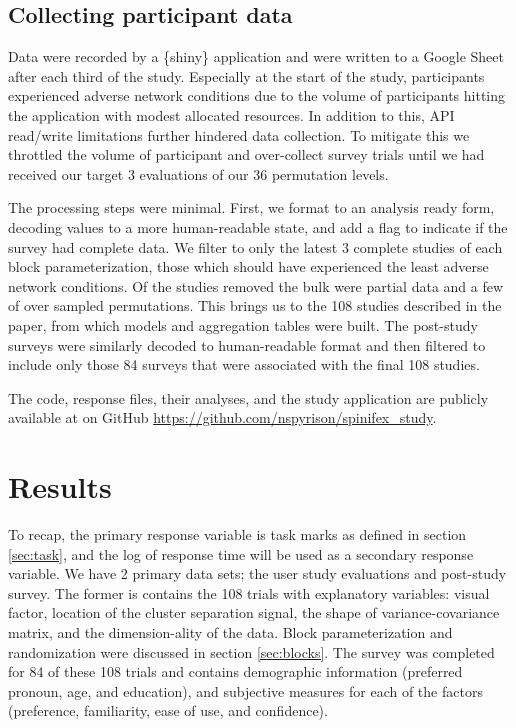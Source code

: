 \documentclass{template/monashthesis}
\begin{document}
\hypertarget{collecting-participant-data}{%
\subsection{Collecting participant data}\label{collecting-participant-data}}

Data were recorded by a \{shiny\} application and were written to a Google Sheet after each third of the study. Especially at the start of the study, participants experienced adverse network conditions due to the volume of participants hitting the application with modest allocated resources. In addition to this, API read/write limitations further hindered data collection. To mitigate this we throttled the volume of participant and over-collect survey trials until we had received our target 3 evaluations of our 36 permutation levels.

The processing steps were minimal. First, we format to an analysis ready form, decoding values to a more human-readable state, and add a flag to indicate if the survey had complete data. We filter to only the latest 3 complete studies of each block parameterization, those which should have experienced the least adverse network conditions. Of the studies removed the bulk were partial data and a few of over sampled permutations. This brings us to the 108 studies described in the paper, from which models and aggregation tables were built. The post-study surveys were similarly decoded to human-readable format and then filtered to include only those 84 surveys that were associated with the final 108 studies.

The code, response files, their analyses, and the study application are publicly available at on GitHub \url{https://github.com/nspyrison/spinifex_study}.

\hypertarget{sec:results}{%
\section{Results}\label{sec:results}}

To recap, the primary response variable is task marks as defined in section \ref{sec:task}, and the log of response time will be used as a secondary response variable. We have 2 primary data sets; the user study evaluations and post-study survey. The former is contains the 108 trials with explanatory variables: visual factor, location of the cluster separation signal, the shape of variance-covariance matrix, and the dimension-ality of the data. Block parameterization and randomization were discussed in section \ref{sec:blocks}. The survey was completed for 84 of these 108 trials and contains demographic information (preferred pronoun, age, and education), and subjective measures for each of the factors (preference, familiarity, ease of use, and confidence).
\end{document}
